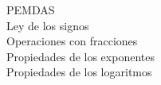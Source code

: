 \documentclass[preview]{standalone}
\begin{document}
PEMDAS\\Ley de los signos\\Operaciones con fracciones\\Propiedades de los exponentes\\Propiedades de los logaritmos\\
\end{document}
